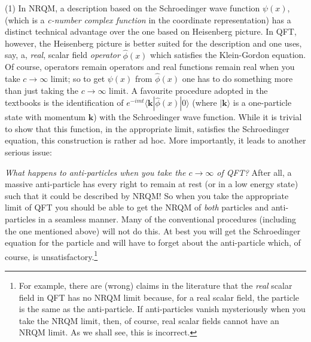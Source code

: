 \documentclass[12pt]{article}
\def\ket#1{|#1\rangle}                    %
\def\bk#1#2#3{{\langle #1|#2|#3\rangle}}  %
\begin{document}
 (1) In NRQM, a description based on  the  Schroedinger wave function $\psi(x)$, (which is a \textit{c-number complex function }  in the coordinate representation) has a distinct technical advantage over the one based on Heisenberg picture. In QFT, however, the Heisenberg picture is better suited for the description and one  uses, say,  a, \textit{real}, scalar field \textit{operator} $\hat \phi(x)$ which satisfies the Klein-Gordon equation. Of course, operators remain operators and real functions remain real when you take $c\to\infty$ limit; so to get $\psi(x)$ from $\hat \phi(x)$ one has to do something more than just taking the $c\to\infty$ limit. A favourite procedure adopted in the textbooks
  is the identification of $e^{-i mt}\bk{{\bm k}}{\hat \phi(x)}{0}$ (where $\ket{{\bm{k}}}$ is a one-particle state with momentum $\bm{k}$) with the Schroedinger wave function. While it is trivial to show that this function, in the appropriate limit, satisfies the Schroedinger equation, this construction is rather ad hoc. More importantly, it leads to another serious issue: 
 
 \textit{What happens to anti-particles when you take the $c\to \infty$ of QFT?} After all, a massive anti-particle has every right to remain at rest (or  in a low energy state) such that it could be described by NRQM! So when you take the appropriate limit of QFT you should be able to get the NRQM of \textit{both} particles and anti-particles in a seamless manner. Many of the conventional procedures (including the one mentioned above) will not do this.
 At best you will get the Schroedinger equation for the particle and will have to forget about the anti-particle which, of course, is unsatisfactory.\footnote{For example, there are (wrong) claims in the literature that the \textit{real} scalar field in QFT has no NRQM limit because, for a real scalar field, the particle is the same as the anti-particle. If anti-particles vanish mysteriously when you take the NRQM limit, then, of course, real scalar fields cannot have an NRQM limit. As we shall see, this is  incorrect.} 
 
\end{document}
